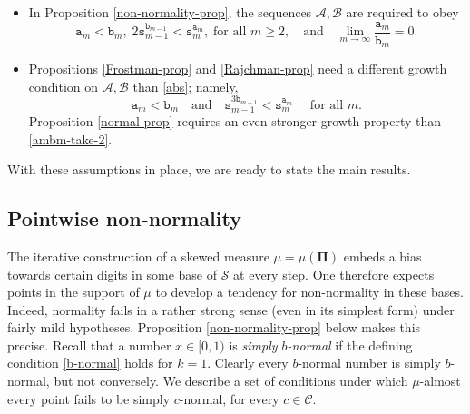 \documentclass[12pt, twoside]{article}
\theoremstyle{definition}
\numberwithin{equation}{section}
\begin{document}
\begin{itemize}
\item In Proposition \ref{non-normality-prop}, the sequences $\mathcal A, \mathcal B$ are required to obey  
\begin{equation} \label{am/bmzero}
\mathtt a_m < \mathtt b_m, \; 2 \mathtt s_{m-1}^{\mathtt b_{m-1}} < \mathtt s_{m}^{\mathtt a_{m}},\; \text{for all } m\geq 2, \quad\text{and} \quad \lim_{m \rightarrow \infty} \frac{\mathtt a_m}{\mathtt b_m} = 0.
\end{equation} 
\item Propositions \ref{Frostman-prop} and \ref{Rajchman-prop} need a different growth condition on $\mathcal A, \mathcal B$ than \eqref{abs}; namely,  
\begin{equation} \label{ambm-take-2}
\mathtt a_m < \mathtt b_m \quad \text{and}\quad  \mathtt s_{m-1}^{3\mathtt b_{m-1}} < \mathtt s_m^{\mathtt a_m} \quad \text{ for all } m. 
\end{equation}  
Proposition \ref{normal-prop} requires an even stronger growth property than \eqref{ambm-take-2}.  
\end{itemize}     
With these assumptions in place, we are ready to state the main results.
\subsection{Pointwise non-normality} \label{nonnormality-statement-section}
The iterative construction of a skewed measure $\mu = \mu(\pmb{\Pi})$ embeds a bias towards certain digits in some base of $\mathcal S$ at every step. One therefore expects points in the support of $\mu$ to develop a tendency for non-normality in these bases. Indeed, normality fails in a rather strong sense (even in its simplest form) under fairly mild hypotheses. Proposition \ref{non-normality-prop} below makes this precise. 
\vskip0.1in 
\noindent  
Recall that a number $x \in [0, 1)$ is {\em{simply $b$-normal}} if the defining condition \eqref{b-normal} holds for $k=1$. Clearly every $b$-normal number is simply $b$-normal, but not conversely. We describe a set of conditions under which $\mu$-almost every point fails to be simply $c$-normal, for every $c \in \mathscr{C}$.  
\end{document}
